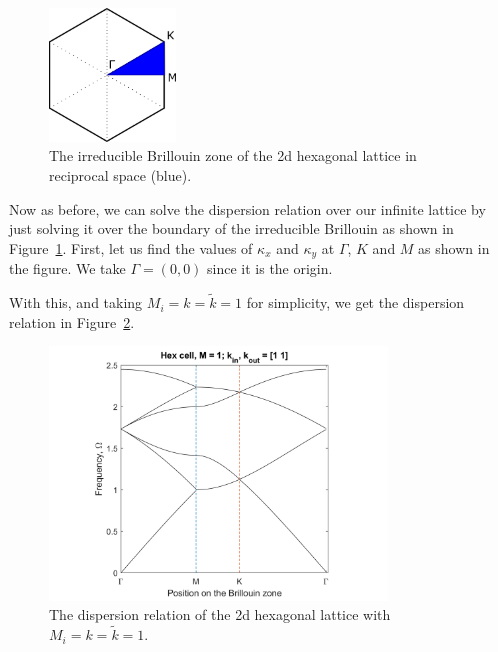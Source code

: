 \begin{figure}[!h]
\centering
\includegraphics[width=0.3\textwidth]{imgs/hexibz.png}
\caption{\label{fig:ibzonehex} The irreducible Brillouin zone of the 2d
    hexagonal lattice in reciprocal space (blue).}
\end{figure}

Now as before, we can solve the dispersion relation over our infinite lattice
by just solving it over the boundary of the irreducible Brillouin as shown in
Figure~\ref{fig:ibzonehex}. First, let us find the values of $\kappa_{x}$ and
$\kappa_{y}$ at $\Gamma$, $K$ and $M$ as shown in the figure. We take
$\Gamma=(0,0)$ since it is the origin. 

With this, and taking $M_i=k=\tilde{k}=1$ for simplicity, we get the dispersion
relation in Figure~\ref{fig:hexdisper}.

\begin{figure}[!h]
\centering
\includegraphics[width=0.8\textwidth]{imgs/hexdisper.png}
\caption{\label{fig:hexdisper} The dispersion relation of the 2d hexagonal
    lattice with $M_i=k=\tilde{k}=1$.}
\end{figure}


